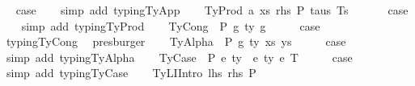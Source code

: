 \begin{isabellebody}
\ \isamarkupfalse%
\ {\isacharquery}{\kern0pt}case\isanewline
\ \ \isamarkupfalse%
\ {\isacharparenleft}{\kern0pt}simp\ add{\isacharcolon}{\kern0pt}\ typing{\isachardot}{\kern0pt}TyApp{\isacharparenright}{\kern0pt}\isanewline
{}\isamarkupfalse%
\isanewline
\ \ \isamarkupfalse%
\ {\isacharparenleft}{\kern0pt}TyProd\ a\ xs\ rhs\ P\ taus\ Ts\ {\isasymGamma}{\isacharparenright}{\kern0pt}\isanewline
\ \ \isamarkupfalse%
\ \isamarkupfalse%
\ {\isacharquery}{\kern0pt}case\isanewline
\ \ \isamarkupfalse%
\ {\isacharparenleft}{\kern0pt}simp\ add{\isacharcolon}{\kern0pt}\ typing{\isachardot}{\kern0pt}TyProd{\isacharparenright}{\kern0pt}\isanewline
{}\isamarkupfalse%
\isanewline
\ \ \isamarkupfalse%
\ {\isacharparenleft}{\kern0pt}TyCong\ {\isasymGamma}\ P\ g{}\ ty\ g{}{\isacharparenright}{\kern0pt}\isanewline
\ \ \isamarkupfalse%
\ \isamarkupfalse%
\ {\isacharquery}{\kern0pt}case\isanewline
\ \ \isamarkupfalse%
\ typing{\isachardot}{\kern0pt}TyCong\ \isamarkupfalse%
\ presburger\isanewline
{}\isamarkupfalse%
\isanewline
\ \ \isamarkupfalse%
\ {\isacharparenleft}{\kern0pt}TyAlpha\ {\isasymGamma}{}\ P\ g\ ty\ xs\ ys{\isacharparenright}{\kern0pt}\isanewline
\ \ \isamarkupfalse%
\ \isamarkupfalse%
\ {\isacharquery}{\kern0pt}case\isanewline
\ \ \isamarkupfalse%
\ {\isacharparenleft}{\kern0pt}simp\ add{\isacharcolon}{\kern0pt}\ typing{\isachardot}{\kern0pt}TyAlpha{\isacharparenright}{\kern0pt}\isanewline
{}\isamarkupfalse%
\isanewline
\ \ \isamarkupfalse%
\ {\isacharparenleft}{\kern0pt}TyCase\ {\isasymGamma}\ P\ e{}\ ty{}\ {\isasymGamma}{}\ e{}\ ty{}\ e{}\ T{\isacharparenright}{\kern0pt}\isanewline
\ \ \isamarkupfalse%
\ \isamarkupfalse%
\ {\isacharquery}{\kern0pt}case\isanewline
\ \ \isamarkupfalse%
\ {\isacharparenleft}{\kern0pt}simp\ add{\isacharcolon}{\kern0pt}\ typing{\isachardot}{\kern0pt}TyCase{\isacharparenright}{\kern0pt}\isanewline
{}\isamarkupfalse%
\isanewline
\ \ \isamarkupfalse%
\ {\isacharparenleft}{\kern0pt}TyLIIntro\ lhs\ rhs\ P\ {\isasymGamma}{\isacharparenright}{\kern0pt}\isanewline

\end{isabellebody}
